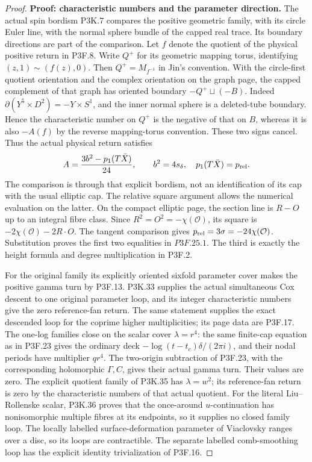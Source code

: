 \begin{proof}
\textbf{Proof: characteristic numbers and the parameter direction.} The actual spin bordism P3K.7 compares the positive geometric family, with its circle Euler line, with the normal sphere bundle of the capped real trace. Its boundary directions are part of the comparison. Let \(f\) denote the quotient of the physical positive return in P3F.8. Write \(Q^+\) for its geometric mapping torus, identifying \((z,1)\sim(f(z),0)\). Then \(Q^+=M_{f^{-1}}\) in Jin's convention. With the circle-first quotient orientation and the complex orientation on the graph page, the capped complement of that graph has oriented boundary \(-Q^+\sqcup(-B)\). Indeed \(\partial(Y^5\times D^2)=-Y\times S^1\), and the inner normal sphere is a deleted-tube boundary. Hence the characteristic number on \(Q^+\) is the negative of that on \(B\), whereas it is also \(-A(f)\) by the reverse mapping-torus convention. These two signs cancel. Thus the actual physical return satisfies \[
 A=\frac{3b^2-p_1(T\bar X)}{24},\qquad
 b^2=4s_\delta,\quad
 p_1(T\bar X)=p_{\rm rel}.
\] The comparison is through that explicit bordism, not an identification of its cap with the usual elliptic cap. The relative square argument allows the numerical evaluation on the latter. On the compact elliptic page, the section line is \(R-O\) up to an integral fibre class. Since \(R^2=O^2=-\chi(\mathcal O)\), its square is \(-2\chi(\mathcal O)-2R\cdot O\). The tangent comparison gives \(p_{\rm rel}=3\sigma=-24\chi(\mathcal O)\). Substitution proves the first two equalities in \(P3F.25.1\). The third is exactly the height formula and degree multiplication in P3F.2.

For the original family its explicitly oriented sixfold parameter cover makes the positive gamma turn by P3F.13. P3K.33 supplies the actual simultaneous Cox descent to one original parameter loop, and its integer characteristic numbers give the zero reference-fan return. The same statement supplies the exact descended loop for the coprime higher multiplicities; its page data are P3F.17. The one-log families close on the scalar cover \(\lambda=r^4\): the same finite-cap equation as in P3F.23 gives the ordinary deck \(-\log(t-t_c)\delta/(2\pi i)\), and their nodal periods have multiplier \(q r^4\). The two-origin subtraction of P3F.23, with the corresponding holomorphic \(\Gamma,C\), gives their actual gamma turn. Their values are zero. The explicit quotient family of P3K.35 has \(\lambda=w^2\); its reference-fan return is zero by the characteristic numbers of that actual quotient. For the literal Liu--Rollenske scalar, P3K.36 proves that the once-around \(u\)-continuation has nonisomorphic multiple fibres at its endpoints, so it supplies no closed family loop. The locally labelled surface-deformation parameter of Viaclovsky ranges over a disc, so its loops are contractible. The separate labelled comb-smoothing loop has the explicit identity trivialization of P3F.16.


\end{proof}
